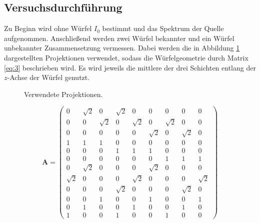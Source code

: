 \subsection{Versuchsdurchführung}
Zu Beginn wird ohne Würfel $I_{0}$ bestimmt und das Spektrum der Quelle aufgenommen.
Anschließend werden zwei Würfel bekannter und ein Würfel unbekannter Zusammensetzung
vermessen.
Dabei werden die in Abbildung \ref{abb:2} dargestellten Projektionen verwendet,
sodass die Würfelgeometrie durch Matrix \eqref{eq:3} beschrieben wird.
Es wird jeweils die mittlere der drei Schichten entlang der $z$-Achse der Würfel genutzt.

\begin{figure}[h!]
    \centering
    
    \caption{Verwendete Projektionen.}
    \label{abb:2}
\end{figure}

\begin{equation}
  \label{eq:3}
    \mathbf{A} =
    \begin{pmatrix}
      0 & \sqrt{2} & 0 & \sqrt{2} & 0 & 0 & 0 & 0 & 0\\
      0 & 0 & \sqrt{2} & 0 & \sqrt{2} & 0 & \sqrt{2} & 0 & 0\\
      0 & 0 & 0 & 0 & 0 & \sqrt{2} & 0 & \sqrt{2} & 0\\
      1 & 1 & 1 & 0 & 0 & 0 & 0 & 0 & 0\\
      0 & 0 & 0 & 1 & 1 & 1 & 0 & 0 & 0\\
      0 & 0 & 0 & 0 & 0 & 0 & 1 & 1 & 1\\
      0 & \sqrt{2} & 0 & 0 & 0 & \sqrt{2} & 0 & 0 & 0\\
      \sqrt{2} & 0 & 0 & 0 & \sqrt{2} & 0 & 0 & 0 & \sqrt{2}\\
      0 & 0 & 0 & \sqrt{2} & 0 & 0 & 0 & \sqrt{2} & 0\\
      0 & 0 & 1 & 0 & 0 & 1 & 0 & 0 & 1\\
      0 & 1 & 0 & 0 & 1 & 0 & 0 & 1 & 0\\
      1 & 0 & 0 & 1 & 0 & 0 & 1 & 0 & 0
    \end{pmatrix}
 \end{equation}
